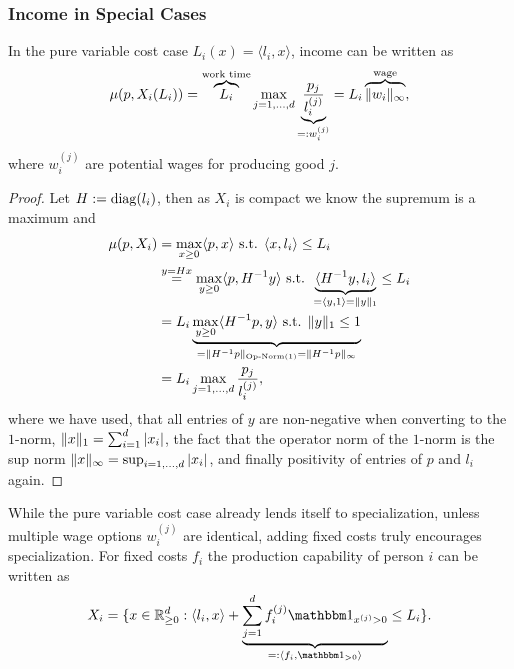 \subsubsection{Income in Special Cases}

\begin{lemma}
	In the pure variable cost case \(L_i(x) = \langle l_i, x\rangle\), income
	can be written as
	\[
		\mu(p, X_i(L_i))
		= \overbrace{L_i}^{\text{work time}} \max_{j=1,\dots,d}
		\underbrace{\frac{p_j}{l_i^{(j)}}}_{=: w_i^{(j)}}
		= L_i \overbrace{\|w_i\|_\infty}^{\text{wage}},
	\]
	where \(w_i^{(j)}\) are potential wages for producing good \(j\).
\end{lemma}
\begin{proof}
	Let \(H:= \operatorname{diag}(l_i)\), then as \(X_i\) is compact we know the supremum is
	a maximum and
	\begin{align*}
		\mu(p, X_i)
		&= \max_{x\ge 0} \langle p, x\rangle
		\text{ s.t. } \langle x, l_i\rangle \le L_i\\
		&\overset{y=Hx}= \max_{y\ge 0} \langle p, H^{-1}y\rangle
		\text{ s.t. } \underbrace{\langle H^{-1}y, l_i\rangle}_{
			= \langle y, 1 \rangle = \|y\|_1
		} \le L_i\\
		&= L_i \underbrace{
			\max_{y\ge 0} \langle H^{-1}p, y\rangle \text{ s.t. } \|y\|_1 \le 1
		}_{
			= \|H^{-1} p\|_{\text{Op-Norm(1)}} = \|H^{-1} p \|_\infty
		}\\
		&= L_i \max_{j=1,\dots,d} \frac{p_j}{l_i^{(j)}},
	\end{align*}
	where we have used, that all entries of \(y\) are non-negative when
	converting to the \(1\)-norm, \(\|x\|_1 = \sum_{i=1}^d |x_i|\), the
	fact that the operator norm of the \(1\)-norm is the sup norm
	\(\|x\|_\infty = \sup_{i=1,\dots,d} |x_i|\),
	and finally positivity of entries of \(p\) and \(l_i\) again.
\end{proof}

While the pure variable cost case already lends itself to specialization, unless
multiple wage options \(w_i^{(j)}\) are identical, adding fixed costs truly
encourages specialization. For fixed costs \(f_i\) the production capability
of person \(i\) can be written as 
\[
	X_i = \{
		x\in \real_{\ge 0}^\dims
		: \langle l_i, x\rangle
		+ \underbrace{
			\sum_{j=1}^\dims f_i^{(j)}\ind_{x^{(j)}>0}
		}_{=: \langle f_i, \ind_{>0}\rangle} \le L_i
	\}.
\]

